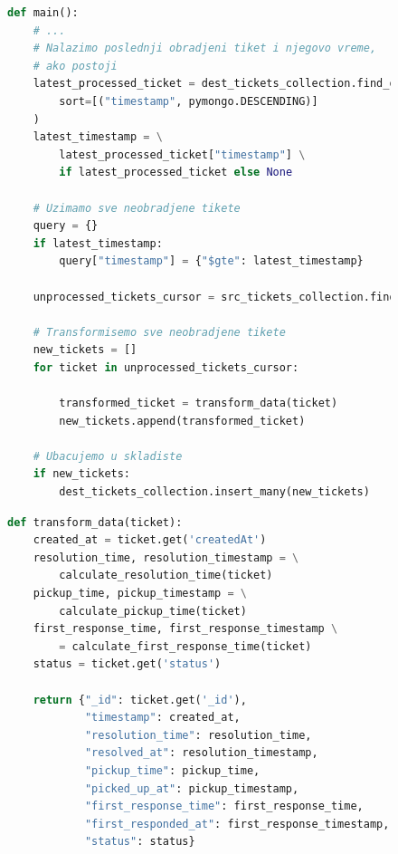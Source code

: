 \documentclass[12pt,oneside]{memoir}
\begin{document}
\begin{figure}[h]
\begin{lstlisting}[language=python, caption={Transformacija tiketa.}, label={lst:ticketetlloop}]
def main():
    # ...
    # Nalazimo poslednji obradjeni tiket i njegovo vreme,
    # ako postoji
    latest_processed_ticket = dest_tickets_collection.find_one(
        sort=[("timestamp", pymongo.DESCENDING)]
    )
    latest_timestamp = \
        latest_processed_ticket["timestamp"] \
        if latest_processed_ticket else None

    # Uzimamo sve neobradjene tikete
    query = {}
    if latest_timestamp:
        query["timestamp"] = {"$gte": latest_timestamp}

    unprocessed_tickets_cursor = src_tickets_collection.find(query)

    # Transformisemo sve neobradjene tikete
    new_tickets = []
    for ticket in unprocessed_tickets_cursor:
        
        transformed_ticket = transform_data(ticket)
        new_tickets.append(transformed_ticket)

    # Ubacujemo u skladiste
    if new_tickets:
        dest_tickets_collection.insert_many(new_tickets)
\end{lstlisting}
\end{figure}

\begin{figure}[h]
\begin{lstlisting}[language=python, caption={Funkcija koja transformiše podatke.}, label={lst:ticketetltransformfunction}]
def transform_data(ticket):
    created_at = ticket.get('createdAt')
    resolution_time, resolution_timestamp = \
        calculate_resolution_time(ticket)
    pickup_time, pickup_timestamp = \
        calculate_pickup_time(ticket)
    first_response_time, first_response_timestamp \
        = calculate_first_response_time(ticket)
    status = ticket.get('status')

    return {"_id": ticket.get('_id'),
            "timestamp": created_at,
            "resolution_time": resolution_time,
            "resolved_at": resolution_timestamp,
            "pickup_time": pickup_time,
            "picked_up_at": pickup_timestamp,
            "first_response_time": first_response_time,
            "first_responded_at": first_response_timestamp,
            "status": status}
\end{lstlisting}
\end{figure}
\end{document}
